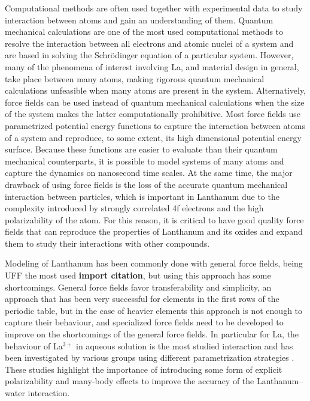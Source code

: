 \documentclass[journal=jpcafh,manuscript=article]{achemso}
\begin{document}
Computational methods are often used together with experimental data to study interaction between atoms and gain an understanding of them.
Quantum mechanical calculations are one of the most used computational methods to resolve the interaction between all electrons and atomic nuclei of a system and are based in solving the Schrödinger equation of a particular system.
However, many of the phenomena of interest involving La, and material design in general, take place between many atoms, making rigorous quantum mechanical calculations unfeasible when many atoms are present in the system.
Alternatively, force fields can be used instead of quantum mechanical calculations when the size of the system makes the latter computationally prohibitive.
Most force fields use parametrized potential energy functions to capture the interaction between atoms of a system and reproduce, to some extent, its high dimensional potential energy surface.
Because these functions are easier to evaluate than their quantum mechanical counterparts, it is possible to model systems of many atoms and capture the dynamics on nanosecond time scales.
At the same time, the major drawback of using force fields is the loss of the accurate quantum mechanical interaction between particles, which is important in Lanthanum due to the complexity introduced by strongly correlated 4f electrons and the high polarizability of the atom.
For this reason, it is critical to have good quality force fields that can reproduce the properties of Lanthanum and its oxides and expand them to study their interactions with other compounds.

Modeling of Lanthanum has been commonly done with general force fields, being UFF the most used \textbf{import citation}, but using this approach has some shortcomings.
General force fields favor transferability and simplicity, an approach that has been very successful for elements in the first rows of the periodic table, but in the case of heavier elements this approach is not enough to capture their behaviour, and specialized force fields need to be developed to improve on the shortcomings of the general force fields.
In particular for La, the behaviour of La$^{3+}$ in aqueous solution is the most studied interaction and has been investigated by various groups using different parametrization strategies \cite{clavaguera2005molecular,duvail2007pair}.
These studies highlight the importance of introducing some form of explicit polarizability and many-body effects to improve the accuracy of the Lanthanum--water interaction.
\end{document}
